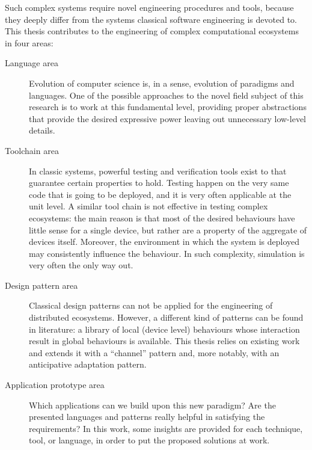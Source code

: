 \documentclass[12pt,a4paper,twoside,openright]{book}
\begin{document}
Such complex systems require novel engineering procedures and tools, because they deeply differ from the systems classical software engineering is devoted to.
%
This thesis contributes to the engineering of complex computational ecosystems in four areas:
\begin{description}
 \item[Language area] Evolution of computer science is, in a sense, evolution of paradigms and languages. One of the possible approaches to the novel field subject of this research is to work at this fundamental level, providing proper abstractions that provide the desired expressive power leaving out unnecessary low-level details.
 \item[Toolchain area] In classic systems, powerful testing and verification tools exist to that guarantee certain properties to hold. Testing happen on the very same code that is going to be deployed, and it is very often applicable at the unit level. A similar tool chain is not effective in testing complex ecosystems: the main reason is that most of the desired behaviours have little sense for a single device, but rather are a property of the aggregate of devices itself. Moreover, the environment in which the system is deployed may consistently influence the behaviour. In such complexity, simulation is very often the only way out.
 \item[Design pattern area] Classical design patterns can not be applied for the engineering of distributed ecosystems. However, a different kind of patterns can be found in literature: a library of local (device level) behaviours whose interaction result in global behaviours is available. This thesis relies on existing work and extends it with a ``channel'' pattern and, more notably, with an anticipative adaptation pattern.
 \item[Application prototype area] Which applications can we build upon this new paradigm? Are the presented languages and patterns really helpful in satisfying the requirements? In this work, some insights are provided for each technique, tool, or language, in order to put the proposed solutions at work.
\end{description}
\end{document}
